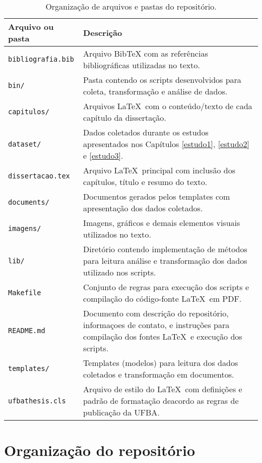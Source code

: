 \begin{table}[ht]
\caption{Organização de arquivos e pastas do repositório.}
\centering
\begin{tabular}{ l p{10cm} }
  \hline
  Arquivo ou pasta            & Descrição           \\
  \hline
  \texttt{bibliografia.bib}   & Arquivo BibTeX com as referências bibliográficas utilizadas no texto. \\
  \texttt{bin/}               & Pasta contendo os scripts desenvolvidos para coleta, transformação e análise de dados. \\
  \texttt{capitulos/}         & Arquivos \LaTeX \ com o conteúdo/texto de cada capítulo da dissertação. \\
  \texttt{dataset/}           & Dados coletados durante os estudos apresentados nos Capítulos \ref{estudo1}, \ref{estudo2} e \ref{estudo3}. \\
  \texttt{dissertacao.tex}    & Arquivo \LaTeX \ principal com inclusão dos capítulos, título e resumo do texto. \\
  \texttt{documents/}         & Documentos gerados pelos templates com apresentação dos dados coletados. \\
  \texttt{imagens/}           & Imagens, gráficos e demais elementos visuais utilizados no texto. \\
  \texttt{lib/}               & Diretório contendo implementação de métodos para leitura análise e transformação dos dados utilizado nos scripts. \\
  \texttt{Makefile}           & Conjunto de regras para execução dos scripts e compilação do código-fonte \LaTeX \ em PDF.                 \\
  \texttt{README.md}          & Documento com descrição do repositório, informaçoes de contato, e instruções para compilação dos fontes \LaTeX \ e execução dos scripts. \\
  \texttt{templates/}         & Templates (modelos) para leitura dos dados coletados e transformação em documentos. \\
  \texttt{ufbathesis.cls}     & Arquivo de estilo do \LaTeX \ com definições e padrão de formatação deacordo as regras de publicação da UFBA. \\
  \hline
\end{tabular}
\label{arquivos-repositorio}
\end{table}

\section{Organização do repositório}

